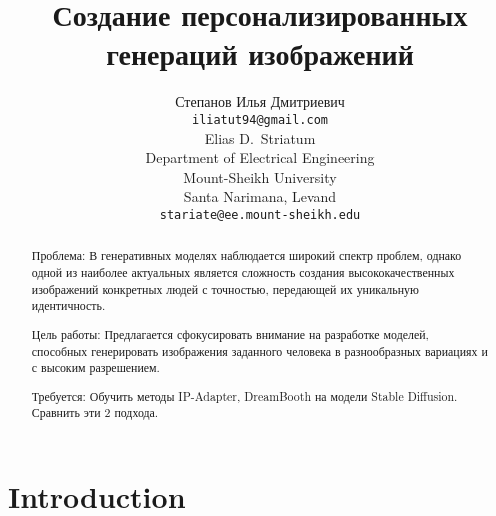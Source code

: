 \documentclass{article}
\title{Создание персонализированных генераций изображений}
\author{Степанов Илья Дмитриевич \\
	\texttt{iliatut94@gmail.com} \\
	\And
	Elias D.~Striatum \\
	Department of Electrical Engineering\\
	Mount-Sheikh University\\
	Santa Narimana, Levand \\
	\texttt{stariate@ee.mount-sheikh.edu} \\
}
\date{}
\begin{document}
\maketitle

\begin{abstract}
        Проблема: В генеративных моделях наблюдается широкий спектр проблем, однако одной из наиболее актуальных является сложность создания высококачественных изображений конкретных людей с точностью, передающей их уникальную идентичность.

        Цель работы: Предлагается сфокусировать внимание на разработке моделей, способных генерировать изображения заданного человека в разнообразных вариациях и с высоким разрешением.

        Требуется: Обучить методы IP-Adapter, DreamBooth на модели Stable Diffusion. Сравнить эти 2 подхода.
\end{abstract}



\section{Introduction}
\end{document}

